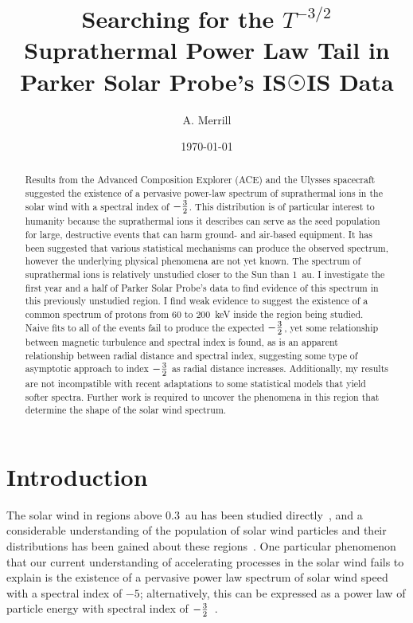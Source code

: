 \documentclass[letterpaper,11pt]{article}
\begin{document}
\title{Searching for the $T^{-3/2}$ Suprathermal Power Law Tail in Parker Solar Probe's IS$\Sun$IS Data}
\author{A. Merrill}
\date{\today}
\maketitle


\begin{abstract}
Results from the Advanced Composition Explorer (ACE) and the Ulysses spacecraft suggested the existence of a pervasive power-law spectrum of suprathermal ions in the solar wind with a spectral index of $-{3 \over 2}$.  This distribution is of particular interest to humanity because the suprathermal ions it describes can serve as the seed population for large, destructive events that can harm ground- and air-based equipment.  It has been suggested that various statistical mechanisms can produce the observed spectrum, however the underlying physical phenomena are not yet known.  The spectrum of suprathermal ions is relatively unstudied closer to the Sun than \SI{1}{\astronomicalunit}.  I investigate the first year and a half of Parker Solar Probe's data to find evidence of this spectrum in this previously unstudied region. I find weak evidence to suggest the existence of a common spectrum of protons from 60 to \SI{200}{\kilo\electronvolt} inside the region being studied.  Naive fits to all of the events fail to produce the expected $-{3 \over 2}$, yet some relationship between magnetic turbulence and spectral index is found, as is an apparent relationship between radial distance and spectral index, suggesting some type of asymptotic approach to index $-{3 \over 2}$ as radial distance increases.  Additionally, my results are not incompatible with recent adaptations to some statistical models that yield softer spectra.  Further work is required to uncover the phenomena  in  this  region  that  determine  the  shape  of  the  solar  wind spectrum.
\end{abstract}

\section{Introduction}
\label{sec:intro}
The solar wind in regions above \SI{0.3}{\astronomicalunit} has been studied directly~\citep{McComas2007}, and a considerable understanding of the population of solar wind particles and their distributions has been gained about these regions~\citep{Giacalone2002,McComas2007}.  One particular phenomenon that our current understanding of accelerating processes in the solar wind fails to explain is the existence of a pervasive power law spectrum of solar wind speed with a spectral index of $-5$; alternatively, this can be expressed as a power law of particle energy with spectral index of $-{3 \over 2}$~\citep{Fisk2012}.
\end{document}
